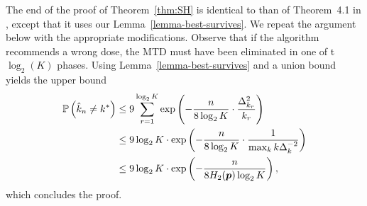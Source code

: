 %
%
The end of the proof of Theorem~\ref{thm:SH} is identical to than of Theorem~4.1 in \cite{icml2013_karnin13}, except that it uses our Lemma~\ref{lemma-best-survives}. We repeat the argument below with the appropriate modifications. 
Observe that if the algorithm recommends a wrong dose, the MTD must have been eliminated in one of t $\log_2(K)$ phases. Using Lemma~\ref{lemma-best-survives} and a union bound yields the upper bound
\begin{align*}
\mathbb{P}\left(\hat{k}_n \neq k^*\right) &\leq 9 \sum_{r=1}^{\log_2 K} \exp \left(
	- \frac{n}{8 \log_2 K} \cdot \frac{\Delta^2_{k_r}}{k_r}
	\right)	
\\
	&\le 9 \log_2 K \cdot \exp \left(
		- \frac{n}{8 \log_2 K} \cdot \frac{1}{\max_k k \Delta^{-2}_k}
	\right)
\\
	&\le 9 \log_2 K \cdot \exp \left(
		- \frac{n}{8 H_2(\bm p) \log_2 K}
	\right),
\end{align*}
which concludes the proof.

